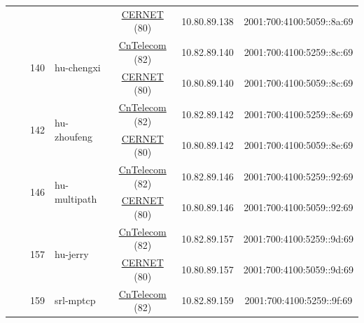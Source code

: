\begin{small}
\begin{center}
\begin{longtable}{|c|c|c|c|c|c|c|c|}
  &  &  &  & \multicolumn{2}{|c|}{\tiny{\href{http://www.cernet.edu.cn}{CERNET} (80)}} & \tiny{10.80.89.138} & \tiny{2001:700:4100:5059::8a:69} \\* \cline{3-3}\cline{4-4}\cline{5-5}\cline{6-6}\cline{7-7}\cline{8-8}
  &  & \multirow{2}{*}{\tiny{140}} & \multicolumn{1}{|l|}{\multirow{2}{*}{\tiny{hu-chengxi}}} & \multicolumn{2}{|c|}{\tiny{\href{http://www.chinatelecom.com.cn}{CnTelecom} (82)}} & \tiny{10.82.89.140} & \tiny{2001:700:4100:5259::8c:69} \\* \cline{5-5}\cline{6-6}\cline{7-7}\cline{8-8}
  &  &  &  & \multicolumn{2}{|c|}{\tiny{\href{http://www.cernet.edu.cn}{CERNET} (80)}} & \tiny{10.80.89.140} & \tiny{2001:700:4100:5059::8c:69} \\* \cline{3-3}\cline{4-4}\cline{5-5}\cline{6-6}\cline{7-7}\cline{8-8}
  &  & \multirow{2}{*}{\tiny{142}} & \multicolumn{1}{|l|}{\multirow{2}{*}{\tiny{hu-zhoufeng}}} & \multicolumn{2}{|c|}{\tiny{\href{http://www.chinatelecom.com.cn}{CnTelecom} (82)}} & \tiny{10.82.89.142} & \tiny{2001:700:4100:5259::8e:69} \\* \cline{5-5}\cline{6-6}\cline{7-7}\cline{8-8}
  &  &  &  & \multicolumn{2}{|c|}{\tiny{\href{http://www.cernet.edu.cn}{CERNET} (80)}} & \tiny{10.80.89.142} & \tiny{2001:700:4100:5059::8e:69} \\* \cline{3-3}\cline{4-4}\cline{5-5}\cline{6-6}\cline{7-7}\cline{8-8}
  &  & \multirow{2}{*}{\tiny{146}} & \multicolumn{1}{|l|}{\multirow{2}{*}{\tiny{hu-multipath}}} & \multicolumn{2}{|c|}{\tiny{\href{http://www.chinatelecom.com.cn}{CnTelecom} (82)}} & \tiny{10.82.89.146} & \tiny{2001:700:4100:5259::92:69} \\* \cline{5-5}\cline{6-6}\cline{7-7}\cline{8-8}
  &  &  &  & \multicolumn{2}{|c|}{\tiny{\href{http://www.cernet.edu.cn}{CERNET} (80)}} & \tiny{10.80.89.146} & \tiny{2001:700:4100:5059::92:69} \\* \cline{3-3}\cline{4-4}\cline{5-5}\cline{6-6}\cline{7-7}\cline{8-8}
  &  & \multirow{2}{*}{\tiny{157}} & \multicolumn{1}{|l|}{\multirow{2}{*}{\tiny{hu-jerry}}} & \multicolumn{2}{|c|}{\tiny{\href{http://www.chinatelecom.com.cn}{CnTelecom} (82)}} & \tiny{10.82.89.157} & \tiny{2001:700:4100:5259::9d:69} \\* \cline{5-5}\cline{6-6}\cline{7-7}\cline{8-8}
  &  &  &  & \multicolumn{2}{|c|}{\tiny{\href{http://www.cernet.edu.cn}{CERNET} (80)}} & \tiny{10.80.89.157} & \tiny{2001:700:4100:5059::9d:69} \\* \cline{3-3}\cline{4-4}\cline{5-5}\cline{6-6}\cline{7-7}\cline{8-8}
  &  & \multirow{2}{*}{\tiny{159}} & \multicolumn{1}{|l|}{\multirow{2}{*}{\tiny{srl-mptcp}}} & \multicolumn{2}{|c|}{\tiny{\href{http://www.chinatelecom.com.cn}{CnTelecom} (82)}} & \tiny{10.82.89.159} & \tiny{2001:700:4100:5259::9f:69} \\* \cline{5-5}\cline{6-6}\cline{7-7}\cline{8-8}

\end{longtable}
\end{center}
\end{small}
